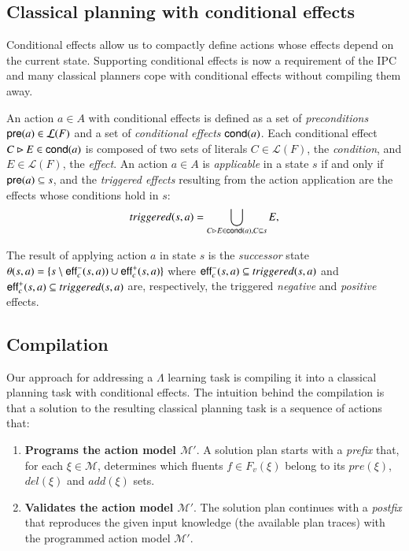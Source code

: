 \subsection{Classical planning with conditional effects}
Conditional effects allow us to compactly define actions whose effects depend on the current state. Supporting conditional effects is now a requirement of the IPC~\cite{vallati:IPC:AIM2015} and many classical planners cope with conditional effects without compiling them away.

An action $a\in A$ with conditional effects is defined as a set of {\em preconditions} $\mathsf{pre}(a)\in\mathcal{L}(F)$ and a set of {\em conditional effects} $\mathsf{cond}(a)$. Each conditional effect $C\rhd E\in\mathsf{cond}(a)$ is composed of two sets of literals $C\in\mathcal{L}(F)$, the {\em condition}, and $E\in\mathcal{L}(F)$, the {\em effect}. An action $a\in A$ is {\em applicable} in a state $s$ if and only if $\mathsf{pre}(a)\subseteq s$, and the {\em triggered effects} resulting from the action application are the effects whose conditions hold in $s$:
\[
triggered(s,a)=\bigcup_{C\rhd E\in\mathsf{cond}(a),C\subseteq s} E,
\]

The result of applying action $a$ in state $s$ is the {\em successor} state $\theta(s,a)=\{s\setminus\mathsf{eff}_c^-(s,a))\cup\mathsf{eff}_c^+(s,a)\}$ where $\mathsf{eff}_c^-(s,a)\subseteq triggered(s,a)$ and $\mathsf{eff}_c^+(s,a)\subseteq triggered(s,a)$ are, respectively, the triggered {\em negative} and {\em positive} effects.


\subsection{Compilation}

Our approach for addressing a $\Lambda$ learning task is compiling it into a classical planning task with conditional effects. The intuition behind the compilation is that a solution to the resulting classical planning task is a sequence of actions that:

\begin{enumerate}
\item {\bf Programs the action model $\mathcal{M}'$}. A solution plan starts with a {\em prefix} that, for each $\xi\in\mathcal{M}$, determines which fluents $f\in F_v(\xi)$ belong to its $pre(\xi)$, $del(\xi)$ and $add(\xi)$ sets.
\item {\bf Validates the action model $\mathcal{M}'$}. The solution plan continues with a {\em postfix} that reproduces the given input knowledge (the available plan traces) with the programmed action model $\mathcal{M}'$.
\end{enumerate}

